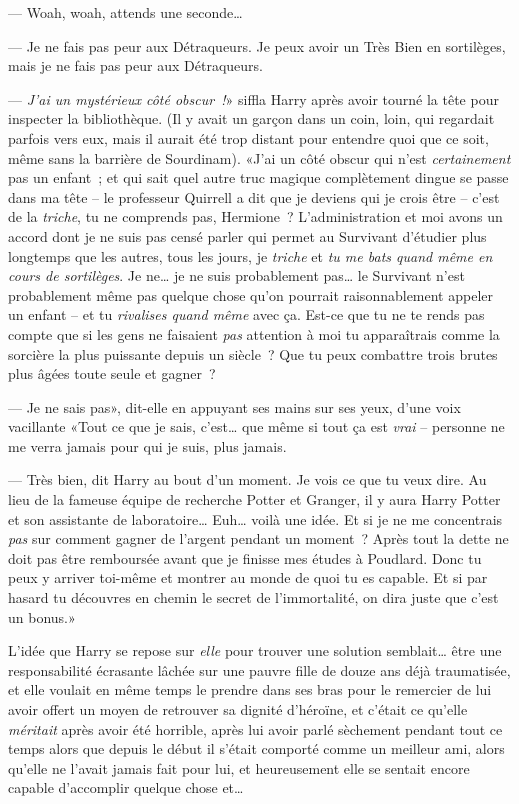 --- Woah, woah, attends une seconde…

--- Je ne fais pas peur aux Détraqueurs. Je peux avoir un Très Bien en sortilèges, mais je ne fais pas peur aux Détraqueurs.

--- \emph{J'ai un mystérieux côté obscur~!}» siffla Harry après avoir tourné la tête pour inspecter la bibliothèque. (Il y avait un garçon dans un coin, loin, qui regardait parfois vers eux, mais il aurait été trop distant pour entendre quoi que ce soit, même sans la barrière de Sourdinam). «J'ai un côté obscur qui n'est \emph{certainement} pas un enfant~; et qui sait quel autre truc magique complètement dingue se passe dans ma tête -- le professeur Quirrell a dit que je deviens qui je crois être -- c'est de la \emph{triche}, tu ne comprends pas, Hermione~? L'administration et moi avons un accord dont je ne suis pas censé parler qui permet au Survivant d'étudier plus longtemps que les autres, tous les jours, je \emph{triche} et \emph{tu me bats quand même en cours de sortilèges}. Je ne… je ne suis probablement pas… le Survivant n'est probablement même pas quelque chose qu'on pourrait raisonnablement appeler un enfant -- et tu \emph{rivalises quand même} avec ça. Est-ce que tu ne te rends pas compte que si les gens ne faisaient \emph{pas} attention à moi tu apparaîtrais comme la sorcière la plus puissante depuis un siècle~? Que tu peux combattre trois brutes plus âgées toute seule et gagner~?

--- Je ne sais pas», dit-elle en appuyant ses mains sur ses yeux, d'une voix vacillante «Tout ce que je sais, c'est… que même si tout ça est \emph{vrai} -- personne ne me verra jamais pour qui je suis, plus jamais.

--- Très bien, dit Harry au bout d'un moment. Je vois ce que tu veux dire. Au lieu de la fameuse équipe de recherche Potter et Granger, il y aura Harry Potter et son assistante de laboratoire… Euh… voilà une idée. Et si je ne me concentrais \emph{pas} sur comment gagner de l'argent pendant un moment~? Après tout la dette ne doit pas être remboursée avant que je finisse mes études à Poudlard. Donc tu peux y arriver toi-même et montrer au monde de quoi tu es capable. Et si par hasard tu découvres en chemin le secret de l'immortalité, on dira juste que c'est un bonus.»

L'idée que Harry se repose sur \emph{elle} pour trouver une solution semblait… être une responsabilité écrasante lâchée sur une pauvre fille de douze ans déjà traumatisée, et elle voulait en même temps le prendre dans ses bras pour le remercier de lui avoir offert un moyen de retrouver sa dignité d'héroïne, et c'était ce qu'elle \emph{méritait} après avoir été horrible, après lui avoir parlé sèchement pendant tout ce temps alors que depuis le début il s'était comporté comme un meilleur ami, alors qu'elle ne l'avait jamais fait pour lui, et heureusement elle se sentait encore capable d'accomplir quelque chose et…

